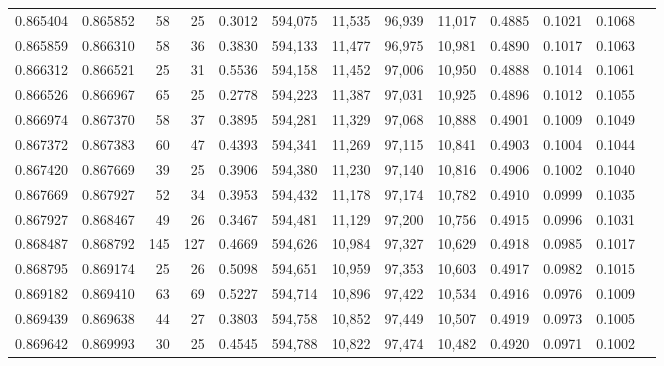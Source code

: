\begin{tabular}{rrrrrrrrrrrrr}
0.865404 & 0.865852 &    58 &  25 &                                     0.3012 & 594,075 &  11,535 &  96,939 &  11,017 & 0.4885 & 0.1021 & 0.1068 \\
0.865859 & 0.866310 &    58 &  36 &                                     0.3830 & 594,133 &  11,477 &  96,975 &  10,981 & 0.4890 & 0.1017 & 0.1063 \\
0.866312 & 0.866521 &    25 &  31 &                                     0.5536 & 594,158 &  11,452 &  97,006 &  10,950 & 0.4888 & 0.1014 & 0.1061 \\
0.866526 & 0.866967 &    65 &  25 &                                     0.2778 & 594,223 &  11,387 &  97,031 &  10,925 & 0.4896 & 0.1012 & 0.1055 \\
0.866974 & 0.867370 &    58 &  37 &                                     0.3895 & 594,281 &  11,329 &  97,068 &  10,888 & 0.4901 & 0.1009 & 0.1049 \\
0.867372 & 0.867383 &    60 &  47 &                                     0.4393 & 594,341 &  11,269 &  97,115 &  10,841 & 0.4903 & 0.1004 & 0.1044 \\
0.867420 & 0.867669 &    39 &  25 &                                     0.3906 & 594,380 &  11,230 &  97,140 &  10,816 & 0.4906 & 0.1002 & 0.1040 \\
0.867669 & 0.867927 &    52 &  34 &                                     0.3953 & 594,432 &  11,178 &  97,174 &  10,782 & 0.4910 & 0.0999 & 0.1035 \\
0.867927 & 0.868467 &    49 &  26 &                                     0.3467 & 594,481 &  11,129 &  97,200 &  10,756 & 0.4915 & 0.0996 & 0.1031 \\
0.868487 & 0.868792 &   145 & 127 &                                     0.4669 & 594,626 &  10,984 &  97,327 &  10,629 & 0.4918 & 0.0985 & 0.1017 \\
0.868795 & 0.869174 &    25 &  26 &                                     0.5098 & 594,651 &  10,959 &  97,353 &  10,603 & 0.4917 & 0.0982 & 0.1015 \\
0.869182 & 0.869410 &    63 &  69 &                                     0.5227 & 594,714 &  10,896 &  97,422 &  10,534 & 0.4916 & 0.0976 & 0.1009 \\
0.869439 & 0.869638 &    44 &  27 &                                     0.3803 & 594,758 &  10,852 &  97,449 &  10,507 & 0.4919 & 0.0973 & 0.1005 \\
0.869642 & 0.869993 &    30 &  25 &                                     0.4545 & 594,788 &  10,822 &  97,474 &  10,482 & 0.4920 & 0.0971 & 0.1002 \\

\end{tabular}
